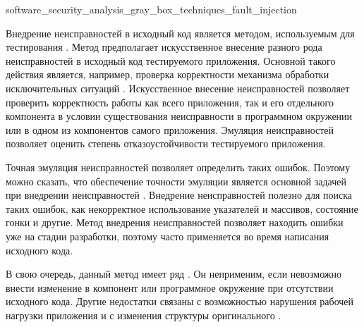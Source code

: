 
	{software_security_analysis_gray_box_techniques_fault_injection}

%
Внедрение неисправностей в исходный код является методом, используемым для тестирования   . 
%
Метод предполагает искусственное внесение разного рода неисправностей в исходный код тестируемого приложения. 
%
Основной  такого действия является, например, проверка корректности механизма обработки исключительных ситуаций . 
%
Искусственное внесение неисправностей позволяет проверить корректность работы как всего приложения, так и его отдельного компонента в условии существования неисправности в программном окружении или в одном из компонентов самого приложения. 
%
Эмуляция неисправностей  позволяет оценить степень отказоустойчивости тестируемого приложения.

%
Точная эмуляция неисправностей позволяет определить  таких ошибок. 
%
Поэтому можно сказать, что обеспечение точности эмуляции является основной задачей при внедрении неисправностей . 
%
Внедрение неисправностей полезно для поиска таких ошибок, как некорректное использование указателей и массивов, состояние гонки и другие. 
%
Метод внедрения неисправностей позволяет находить ошибки уже на стадии разработки, поэтому часто применяется во время написания исходного кода.

%
В свою очередь, данный метод имеет ряд  . 
%
Он неприменим, если невозможно внести изменение в компонент или программное окружение при отсутствии исходного кода. 
%
Другие недостатки связаны с возможностью нарушения рабочей нагрузки приложения и с изменения структуры оригинального .